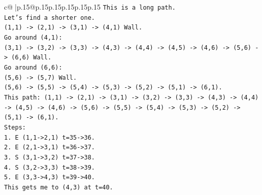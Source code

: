 \documentclass{article}
\begin{document}
{\begin{supertabular}{c@{$\;$}|p{.15\linewidth}@{}p{.15\linewidth}p{.15\linewidth}p{.15\linewidth}p{.15\linewidth}p{.15\linewidth}}
{{{\texttt{This is a long path.} \\
\texttt{Let's find a shorter one.} \\
\texttt{(1,1) {-}> (2,1) {-}> (3,1) {-}> (4,1) Wall.} \\
\texttt{Go around (4,1):} \\
\texttt{(3,1) {-}> (3,2) {-}> (3,3) {-}> (4,3) {-}> (4,4) {-}> (4,5) {-}> (4,6) {-}> (5,6) {-}> (6,6) Wall.} \\
\texttt{Go around (6,6):} \\
\texttt{(5,6) {-}> (5,7) Wall.} \\
\texttt{(5,6) {-}> (5,5) {-}> (5,4) {-}> (5,3) {-}> (5,2) {-}> (5,1) {-}> (6,1).} \\
\texttt{This path: (1,1) {-}> (2,1) {-}> (3,1) {-}> (3,2) {-}> (3,3) {-}> (4,3) {-}> (4,4) {-}> (4,5) {-}> (4,6) {-}> (5,6) {-}> (5,5) {-}> (5,4) {-}> (5,3) {-}> (5,2) {-}> (5,1) {-}> (6,1).} \\
\texttt{Steps:} \\
\texttt{1. E (1,1{-}>2,1) t=35{-}>36.} \\
\texttt{2. E (2,1{-}>3,1) t=36{-}>37.} \\
\texttt{3. S (3,1{-}>3,2) t=37{-}>38.} \\
\texttt{4. S (3,2{-}>3,3) t=38{-}>39.} \\
\texttt{5. E (3,3{-}>4,3) t=39{-}>40.} \\
\texttt{This gets me to (4,3) at t=40.} \\
}}}
\end{supertabular}}
\end{document}
